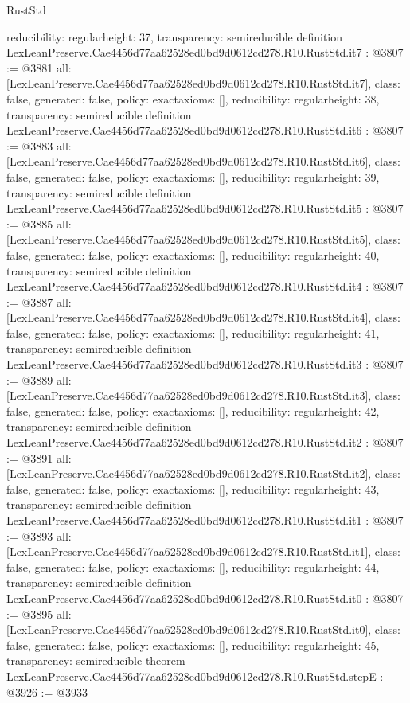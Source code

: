 \begin{lexlean}{RustStd}
\begin{coremodule}
{  reducibility: regular{height: 37},
  transparency: semireducible
}
definition LexLeanPreserve.Cae4456d77aa62528ed0bd9d0612cd278.R10.RustStd.it7 : @3807 := @3881 {
  all: [LexLeanPreserve.Cae4456d77aa62528ed0bd9d0612cd278.R10.RustStd.it7],
  class: false,
  generated: false,
  policy: exact{axioms: []},
  reducibility: regular{height: 38},
  transparency: semireducible
}
definition LexLeanPreserve.Cae4456d77aa62528ed0bd9d0612cd278.R10.RustStd.it6 : @3807 := @3883 {
  all: [LexLeanPreserve.Cae4456d77aa62528ed0bd9d0612cd278.R10.RustStd.it6],
  class: false,
  generated: false,
  policy: exact{axioms: []},
  reducibility: regular{height: 39},
  transparency: semireducible
}
definition LexLeanPreserve.Cae4456d77aa62528ed0bd9d0612cd278.R10.RustStd.it5 : @3807 := @3885 {
  all: [LexLeanPreserve.Cae4456d77aa62528ed0bd9d0612cd278.R10.RustStd.it5],
  class: false,
  generated: false,
  policy: exact{axioms: []},
  reducibility: regular{height: 40},
  transparency: semireducible
}
definition LexLeanPreserve.Cae4456d77aa62528ed0bd9d0612cd278.R10.RustStd.it4 : @3807 := @3887 {
  all: [LexLeanPreserve.Cae4456d77aa62528ed0bd9d0612cd278.R10.RustStd.it4],
  class: false,
  generated: false,
  policy: exact{axioms: []},
  reducibility: regular{height: 41},
  transparency: semireducible
}
definition LexLeanPreserve.Cae4456d77aa62528ed0bd9d0612cd278.R10.RustStd.it3 : @3807 := @3889 {
  all: [LexLeanPreserve.Cae4456d77aa62528ed0bd9d0612cd278.R10.RustStd.it3],
  class: false,
  generated: false,
  policy: exact{axioms: []},
  reducibility: regular{height: 42},
  transparency: semireducible
}
definition LexLeanPreserve.Cae4456d77aa62528ed0bd9d0612cd278.R10.RustStd.it2 : @3807 := @3891 {
  all: [LexLeanPreserve.Cae4456d77aa62528ed0bd9d0612cd278.R10.RustStd.it2],
  class: false,
  generated: false,
  policy: exact{axioms: []},
  reducibility: regular{height: 43},
  transparency: semireducible
}
definition LexLeanPreserve.Cae4456d77aa62528ed0bd9d0612cd278.R10.RustStd.it1 : @3807 := @3893 {
  all: [LexLeanPreserve.Cae4456d77aa62528ed0bd9d0612cd278.R10.RustStd.it1],
  class: false,
  generated: false,
  policy: exact{axioms: []},
  reducibility: regular{height: 44},
  transparency: semireducible
}
definition LexLeanPreserve.Cae4456d77aa62528ed0bd9d0612cd278.R10.RustStd.it0 : @3807 := @3895 {
  all: [LexLeanPreserve.Cae4456d77aa62528ed0bd9d0612cd278.R10.RustStd.it0],
  class: false,
  generated: false,
  policy: exact{axioms: []},
  reducibility: regular{height: 45},
  transparency: semireducible
}
theorem LexLeanPreserve.Cae4456d77aa62528ed0bd9d0612cd278.R10.RustStd.stepE : @3926 := @3933 {
}
\end{coremodule}
\end{lexlean}
